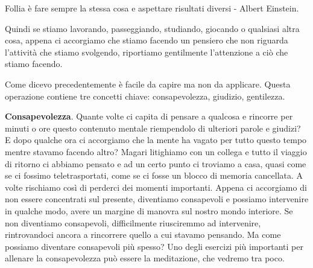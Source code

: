\documentclass[12pt]{book} %
\begin{document}
Follia è fare sempre la stessa cosa e aspettare risultati diversi - Albert Einstein.

Quindi se stiamo lavorando, passeggiando, studiando, giocando o qualsiasi altra cosa, appena ci accorgiamo che stiamo
facendo un pensiero che non riguarda l'attività che stiamo svolgendo, riportiamo gentilmente
l'attenzione a ciò che stiamo facendo. 

Come dicevo precedentemente è facile da capire ma non da applicare. Questa operazione contiene tre concetti chiave:
consapevolezza, giudizio, gentilezza.

\textbf{Consapevolezza}. Quante volte ci capita di pensare a qualcosa e rincorre per minuti o ore questo contenuto mentale
riempendolo di ulteriori parole e giudizi? E dopo qualche ora ci accorgiamo che la mente ha vagato per tutto questo
tempo mentre stavamo facendo altro? Magari litighiamo con un collega e tutto il viaggio di ritorno ci abbiamo pensato e
ad un certo punto ci troviamo a casa, quasi come se ci fossimo teletrasportati, come se ci fosse un blocco di memoria
cancellata. A volte rischiamo così di perderci dei momenti importanti. Appena ci accorgiamo di non essere concentrati
sul presente, diventiamo consapevoli e possiamo intervenire in qualche modo, avere un margine di manovra sul nostro
mondo interiore. Se non diventiamo consapevoli, difficilmente riusciremmo ad intervenire, rintrovandoci ancora a rincorrere quello a cui
stavamo pensando. Ma come possiamo diventare consapevoli più spesso? Uno degli esercizi più importanti per allenare la consapevolezza può essere la meditazione, che vedremo tra poco.
\end{document}
